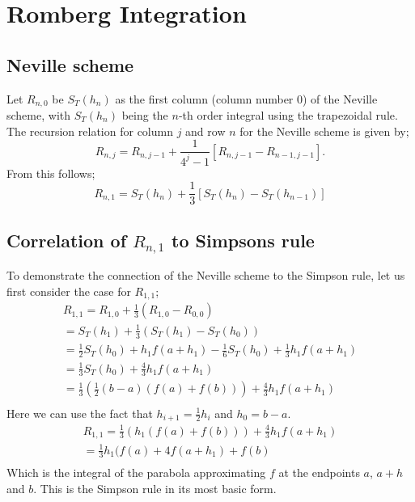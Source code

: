 \documentclass[11pt]{article}
\begin{document}
\section{Romberg Integration}
\label{sec:org8dc31bd}
\subsection{Neville scheme}
\label{sec:org1119923}
Let \(R_{n,0}\) be \(S_T(h_n)\) as the first column (column number 0) of the Neville scheme, 
with \(S_T(h_n)\) being the \(n\)-th order integral using the trapezoidal rule. 
The recursion relation for column \(j\) and row \(n\) for the Neville scheme is given by;
\begin{equation}
	R_{n,j} = R_{n,j-1} + \frac{1}{4^j - 1}[R_{n,j-1}-R_{n-1,j-1}].
\end{equation}
From this follows;
\begin{equation}
	R_{n,1} = S_T(h_n) + \frac{1}{3}[S_T(h_n)-S_T(h_{n-1})]
\end{equation}

\subsection{Correlation of \(R_{n,1}\) to Simpsons rule}
\label{sec:org135847d}
To demonstrate the connection of the Neville scheme to the Simpson rule, 
let us first consider the case for \(R_{1,1}\);
\begin{multline}
R_{1,1} = R_{1,0}+\frac{1}{3}(R_{1,0}-R_{0,0}) \\
 = S_T(h_1) + \frac{1}{3}(S_T(h_1)-S_T(h_0)) \\
 = \frac{1}{2}S_T(h_0) + h_1 f(a+h_1) - \frac{1}{6}S_T(h_0) + \frac{1}{3}h_1 f(a+h_1)\\
 = \frac{1}{3}S_T(h_0) + \frac{4}{3}h_1 f(a+h_1)\\
 = \frac{1}{3}(\frac{1}{2}(b-a)(f(a)+f(b))) + \frac{4}{3}h_1 f(a+h_1)\\
\end{multline}
Here we can use the fact that \(h_{i+1} = \frac{1}{2}h_i\) and \(h_0 = b - a\).
\begin{multline}
R_{1,1} = \frac{1}{3}(h_1(f(a)+f(b))) + \frac{4}{3}h_1 f(a+h_1)\\
= \frac{1}{3}h_1(f(a)+ 4f(a+h_1) + f(b)\\
\end{multline}
Which is the integral of the parabola approximating \(f\) at the endpoints \(a\), \(a+h\) and \(b\). 
This is the Simpson rule in its most basic form.
\end{document}
